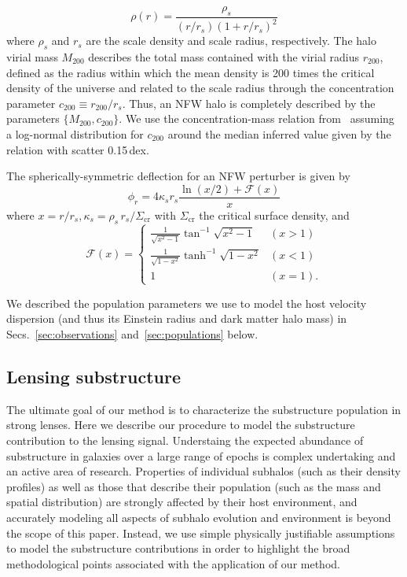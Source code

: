 \documentclass[twocolumn]{aastex62}
\begin{document}
\begin{equation}
\rho(r)=\frac{\rho_{s}}{\left(r / r_{s}\right)\left(1+r / r_{s}\right)^{2}}
\label{eq:rhoNFW}
\end{equation}
where $\rho_s$ and $r_s$ are the scale density and scale radius, respectively. The halo virial mass $M_{200}$ describes the total mass contained with the virial radius $r_{200}$, defined as the radius within which the mean density is 200 times the critical density of the universe and related to the scale radius through the concentration parameter $c_{200} \equiv r_{200}/r_s$. Thus, an NFW halo is completely described by the parameters $\{M_{200}, c_{200}\}$. We use the concentration-mass relation from~\citet{2014MNRAS.442.2271S} assuming a log-normal distribution for $c_{200}$ around the median inferred value given by the relation with scatter 0.15\,dex.

The spherically-symmetric deflection for an NFW perturber is given by~\citep{2001astro.ph..2341K}
\begin{equation}
\phi_{r}=4 \kappa_{s} r_{s} \frac{\ln (x / 2)+\mathcal{F}(x)}{x}
\end{equation}
where $x = r/r_s, \kappa_s = \rho_s\,r_s/\Sigma_\mathrm{cr}$ with $\Sigma_\mathrm{cr}$ the critical surface density, and
\begin{equation}
\mathcal{F}(x)=\left\{\begin{array}{ll}{\frac{1}{\sqrt{x^{2}-1}} \tan ^{-1} \sqrt{x^{2}-1}} & {(x>1)} \\ {\frac{1}{\sqrt{1-x^{2}}} \tanh ^{-1} \sqrt{1-x^{2}}} & {(x<1)} \\ {1} & {(x=1).}\end{array}\right.
\label{eq:Fx}
\end{equation}

We described the population parameters we use to model the host velocity dispersion (and thus its Einstein radius and dark matter halo mass) in Secs.~\ref{sec:observations} and~\ref{sec:populations} below.

\subsection{Lensing substructure}

The ultimate goal of our method is to characterize the substructure population in strong lenses. Here we describe our procedure to model the substructure contribution to the lensing signal. Understaing the expected abundance of substructure in galaxies over a large range of epochs is complex undertaking and an active area of research. Properties of individual subhalos (such as their density profiles) as well as those that describe their population (such as the mass and spatial distribution) are strongly affected by their host environment, and accurately modeling all aspects of subhalo evolution and environment is beyond the scope of this paper. Instead, we use simple physically justifiable assumptions to model the substructure contributions in order to highlight the broad methodological points associated with the application of our method.
\end{document}
